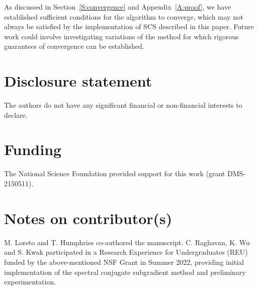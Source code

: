 \documentclass[]{interact}
\theoremstyle{plain}%
\theoremstyle{definition}
\theoremstyle{remark}
\begin{document}
As discussed in Section~\ref{S:convergence} and Appendix~\ref{A:proof}, we have established sufficient conditions for the algorithm to converge, which may not always be satisfied by the implementation of SCS described in this paper. Future work could involve investigating variations of the method for which rigorous guarantees of convergence can be established.

%


\section*{Disclosure statement}

{The authors do not have any significant financial or non-financial interests to declare.}


\section*{Funding}

{The National Science Foundation provided support for this work (grant DMS-2150511).}


\section*{Notes on contributor(s)}

M. Loreto and T. Humphries co-authored the manuscript. C. Raghavan, K. Wu and S. Kwak participated in a Research Experience for Undergraduates (REU) funded by the above-mentioned NSF Grant in Summer 2022, providing initial implementation of the spectral conjugate subgradient method and preliminary experimentation.
\end{document}
